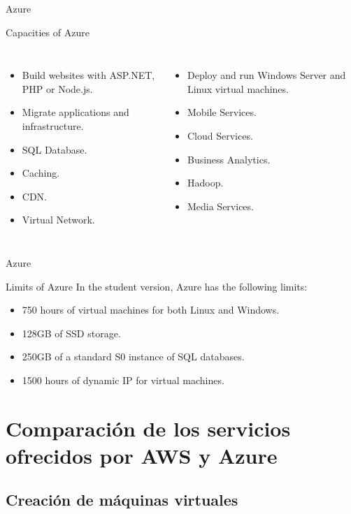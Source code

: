 \documentclass[aspectratio=169]{beamer}
\begin{document}
\begin{frame}{Azure}
\begin{block}{Capacities of Azure}
	\begin{columns}
		\begin{itemize}
			\item Build websites with ASP.NET, PHP or Node.js.
			\item Migrate applications and infrastructure.
			\item SQL Database.
			\item Caching.
			\item CDN.
			\item Virtual Network.
		\end{itemize}
		\begin{itemize}
			\item Deploy and run Windows Server and Linux virtual machines.
			\item Mobile Services.
			\item Cloud Services.
			\item Business Analytics.
			\item Hadoop.
			\item Media Services.
		\end{itemize}
	\end{columns}
\end{block}
\end{frame}

\begin{frame}{Azure}
	\begin{block}{Limits of Azure}
		In the student version, Azure has the following limits:
		\begin{itemize}
			\item 750 hours of virtual machines for both Linux and Windows.
			\item 128GB of SSD storage.
			\item 250GB of a standard S0 instance of SQL databases.
			\item 1500 hours of dynamic IP for virtual machines.
		\end{itemize}
	\end{block}
\end{frame}

\section{Comparación de los servicios ofrecidos por AWS y Azure}
\subsection{Creación de máquinas virtuales}
\end{document}
